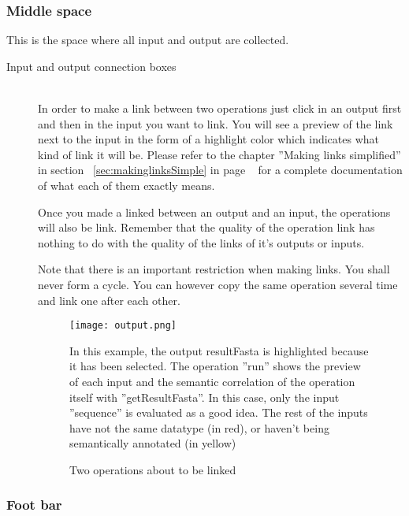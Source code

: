 \documentclass[a4paper,10pt]{article}
\begin{document}
    \subsubsection{Middle space}

    This is the space where all input and output are collected.

    \begin{description}
      \item[Input and output connection boxes] \hfill \\
	In order to make a link between two operations just click in an output first and then in the input you want to link. You will see a preview of the link next to the input in the form of a highlight color which indicates what kind of link it will be. Please refer to the chapter ''Making links simplified'' in section ~\ref{sec:makinglinksSimple} in page ~\pageref{sec:makinglinksSimple} for a complete documentation of what each of them exactly means.\vspace{3 mm}

	Once you made a linked between an output and an input, the operations will also be link. Remember that the quality of the operation link has nothing to do with the quality of the links of it's outputs or inputs.\vspace{3 mm}

	Note that there is an important restriction when making links. You shall never form a cycle. You can however copy the same operation several time and link one after each other.

	\begin{figure}[H]
	  {\centering  
	  \texttt{[image: output.png]}
	  \caption{Two operations about to be linked}}
	  \medskip
	  \small
	  In this example, the output resultFasta is highlighted because it has been selected. The operation ''run'' shows the preview of each input and the semantic correlation of the operation itself with ''getResultFasta''. In this case, only the input ''sequence'' is evaluated as a good idea. The rest of the inputs have not the same datatype (in red), or haven't being semantically annotated (in yellow)
	\end{figure}


    \end{description}

    \subsubsection{Foot bar}
\end{document}
